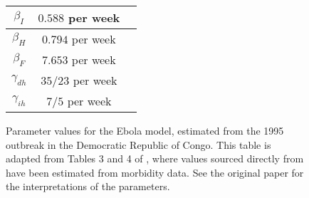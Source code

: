 \begin{figure}
\begin{center}
\begin{tabular}{|c|c|p{8cm}|}
			\(\beta_I\)     & \(0.588\) per week   & \citet{LegrandEtAl_2007_UnderstandingDynamicsEbola}                                                                                    \\ \hline
			\(\beta_H\)     & \(0.794\) per week   & \citet{LegrandEtAl_2007_UnderstandingDynamicsEbola}                                                                                    \\ \hline
			\(\beta_F\)     & \(7.653\) per week   & \citet{LegrandEtAl_2007_UnderstandingDynamicsEbola}                                                                                    \\ \hline
			\(\gamma_{dh}\) & \(35 / 23\) per week & \citet{LegrandEtAl_2007_UnderstandingDynamicsEbola}                                                                                    \\ \hline
			\(\gamma_{ih}\) & \(7 / 5\) per week   & \citet{LegrandEtAl_2007_UnderstandingDynamicsEbola}                                                                                    \\ \hline
		\end{tabular}
	\end{center}
	\caption{Parameter values for the Ebola model, estimated from the 1995 outbreak in the Democratic Republic of Congo.
		This table is adapted from Tables 3 and 4 of \citet{LegrandEtAl_2007_UnderstandingDynamicsEbola}, where values sourced directly from \citet{LegrandEtAl_2007_UnderstandingDynamicsEbola} have been estimated from morbidity data.
		See the original paper for the interpretations of the parameters.}
	\label{tab:ebola_param_vals}
\end{figure}

